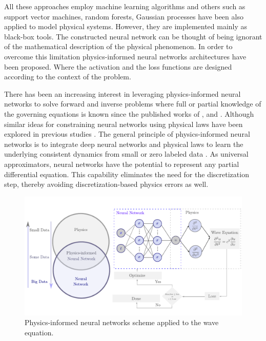 \documentclass[11pt,twoside]{article}
\begin{document}
All these approaches employ machine learning algorithms and others such as support vector machines, 
random forests, Gaussian processes have been also applied to model physical systems. However, they 
are implemented mainly as black-box tools. The constructed neural network can be thought of being 
ignorant of the mathematical description of the physical phenomenon. In order to overcome this 
limitation physics-informed neural networks architectures have been proposed. Where the activation 
and the loss functions are designed according to the context of the problem.

There has been an increasing interest in leveraging physics-informed neural networks to solve forward and 
inverse problems where full or partial knowledge of the governing equations is known since the published 
works of ,  and 
. Although similar ideas for constraining neural networks using physical 
laws have been explored in previous studies \citep{lagaris_artificial_1998}. The general principle of 
physics-informed neural networks is to integrate deep neural networks and physical laws to learn the 
underlying consistent dynamics from small or zero labeled data \citep{karniadakis_physics-informed_2021}. 
As universal approximators, neural networks have the potential to represent any partial differential 
equation. This capability eliminates the need for the discretization step, thereby avoiding 
discretization-based physics errors as well. 

\begin{figure}[h]
\centering
    \includegraphics[width=1.0\textwidth]{figs/scheme_pinns_waves.pdf}
    \caption{Physics-informed neural networks scheme applied to the wave equation.}
    \label{deep_learning_subset_architecture}
\end{figure}
\end{document}
